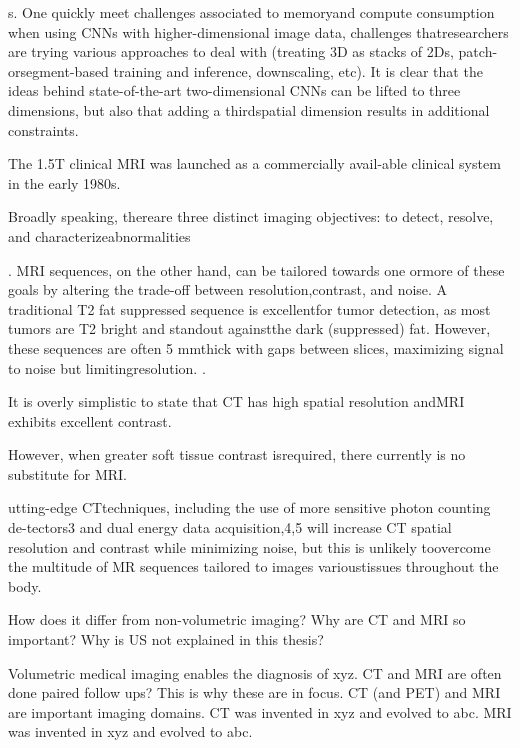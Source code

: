         s. One quickly meet challenges associated to memoryand compute consumption when using CNNs with higher-dimensional image data, challenges thatresearchers are trying various approaches to deal with (treating 3D as stacks of 2Ds, patch- orsegment-based training and inference, downscaling, etc). It is clear that the ideas behind state-of-the-art two-dimensional CNNs can be lifted to three dimensions, but also that adding a thirdspatial dimension results in additional constraints. \cite{lundervold2019overview}

        The 1.5T clinical MRI was launched as a commercially avail-able clinical system in the early 1980s. \cite{kabasawa2022mr}


        Broadly speaking, thereare three distinct imaging objectives: to detect, resolve, and characterizeabnormalities \cite{abramson2023surgeons}

        . MRI sequences, on the other hand, can be tailored towards one ormore of these goals by altering the trade-off between resolution,contrast, and noise. A traditional T2 fat suppressed sequence is excellentfor tumor detection, as most tumors are T2 bright and standout againstthe dark (suppressed) fat. However, these sequences are often 5 mmthick with gaps between slices, maximizing signal to noise but limitingresolution. \cite{abramson2023surgeons}.

        It is overly simplistic to state that CT has high spatial resolution andMRI exhibits excellent contrast. \cite{abramson2023surgeons}

        However, when greater soft tissue contrast isrequired, there currently is no substitute for MRI. \cite{abramson2023surgeons}

        utting-edge CTtechniques, including the use of more sensitive photon counting de-tectors3 and dual energy data acquisition,4,5 will increase CT spatial resolution and contrast while minimizing noise, but this is unlikely toovercome the multitude of MR sequences tailored to images varioustissues throughout the body.  \cite{abramson2023surgeons}

        \cite{litjens2017survey}
        \cite{piccialli2021survey}

        How does it differ from non-volumetric imaging?
        Why are CT and MRI so important?
        Why is US not explained in this thesis?

        Volumetric medical imaging enables the diagnosis of xyz.
        CT and MRI are often done paired follow ups? This is why these are in focus.
        CT (and PET) and MRI are important imaging domains.
        CT was invented in xyz and evolved to abc.
        MRI was invented in xyz and evolved to abc.

